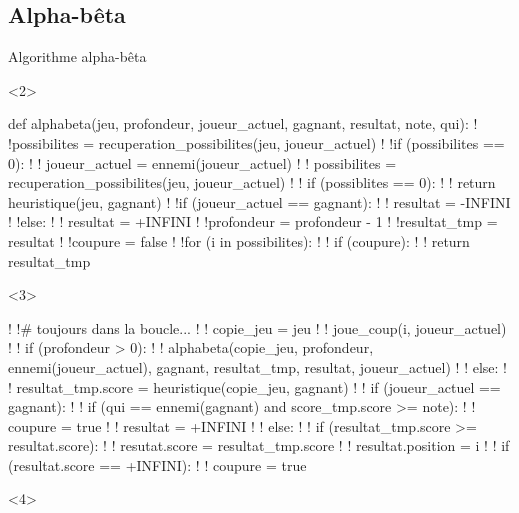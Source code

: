\documentclass{beamer}
\begin{document}
\subsection*{Alpha-bêta}
\begin{frame}[fragile]{Algorithme alpha-bêta}
    \begin{onlyenv}<2>
        \begin{pseudocode}
            def alphabeta(jeu, profondeur, joueur_actuel, gagnant, resultat, note, qui):
            !  !possibilites = recuperation_possibilites(jeu, joueur_actuel)
            !  !if (possibilites == 0):
            !  !    joueur_actuel = ennemi(joueur_actuel)
            !  !    possibilites = recuperation_possibilites(jeu, joueur_actuel)
            !  !    if (possiblites == 0):
            !  !        return heuristique(jeu, gagnant)
            !  !if (joueur_actuel == gagnant):
            !  !    resultat = -INFINI
            !  !else:
            !  !    resultat = +INFINI
            !  !profondeur = profondeur - 1
            !  !resultat_tmp = resultat
            !  !coupure = false
            !  !for (i in possibilites):
            !  !    if (coupure):
            !  !        return resultat_tmp
        \end{pseudocode}
    \end{onlyenv}
    \begin{onlyenv}<3>
        \begin{pseudocode}
            !  !# toujours dans la boucle...
            !  !    copie_jeu = jeu
            !  !    joue_coup(i, joueur_actuel)
            !  !    if (profondeur > 0):
            !  !        alphabeta(copie_jeu, profondeur, ennemi(joueur_actuel), gagnant, resultat_tmp, resultat, joueur_actuel)
            !  !    else:
            !  !        resultat_tmp.score = heuristique(copie_jeu, gagnant)
            !  !    if (joueur_actuel == gagnant):
            !  !        if (qui == ennemi(gagnant) and score_tmp.score >= note):
            !  !            coupure = true
            !  !            resultat = +INFINI
            !  !        else:
            !  !            if (resultat_tmp.score >= resultat.score):
            !  !                resutat.score = resultat_tmp.score
            !  !                resultat.position = i
            !  !                if (resultat.score == +INFINI):
            !  !                    coupure = true
        \end{pseudocode}
    \end{onlyenv}
    \begin{onlyenv}<4>

\end{onlyenv}
\end{frame}
\end{document}
